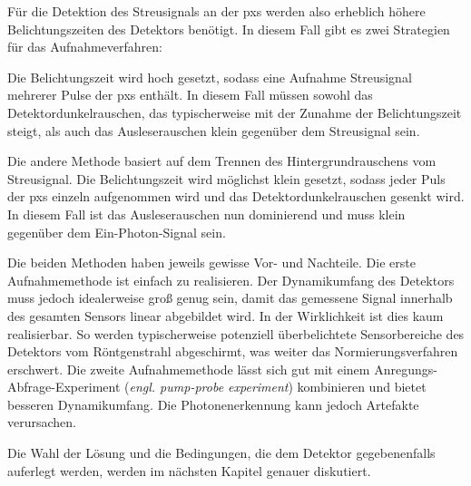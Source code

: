 \noindent
Für die Detektion des Streusignals an der \gls{pxs} werden also erheblich höhere Belichtungszeiten des Detektors benötigt. In diesem Fall gibt es zwei Strategien für das Aufnahmeverfahren:

\noindent
Die Belichtungszeit wird hoch gesetzt, sodass eine Aufnahme Streusignal mehrerer Pulse der \gls{pxs} enthält. In diesem Fall müssen sowohl das Detektordunkelrauschen, das typischerweise mit der Zunahme der Belichtungszeit steigt, als auch das Ausleserauschen klein gegenüber dem Streusignal sein.

\noindent
Die andere Methode basiert auf dem Trennen des Hintergrundrauschens vom Streusignal. Die Belichtungszeit wird möglichst klein gesetzt, sodass jeder Puls der \gls{pxs} einzeln aufgenommen wird und das Detektordunkelrauschen gesenkt wird. In diesem Fall ist das Ausleserauschen nun dominierend und muss klein gegenüber dem Ein-Photon-Signal sein.

\noindent
Die beiden Methoden haben jeweils gewisse Vor- und Nachteile. Die erste Aufnahmemethode ist einfach zu realisieren. Der Dynamikumfang des Detektors muss jedoch idealerweise groß genug sein, damit das gemessene Signal innerhalb des gesamten Sensors linear abgebildet wird. In der Wirklichkeit ist dies kaum realisierbar. So werden typischerweise potenziell überbelichtete Sensorbereiche des Detektors vom Röntgenstrahl abgeschirmt, was weiter das Normierungsverfahren erschwert. Die zweite Aufnahmemethode lässt sich gut mit einem Anregungs-Abfrage-Experiment (\emph{engl. pump-probe experiment}) kombinieren und bietet besseren Dynamikumfang. Die Photonenerkennung kann jedoch Artefakte verursachen.

\noindent
Die Wahl der Lösung und die Bedingungen, die dem Detektor gegebenenfalls auferlegt werden, werden im nächsten Kapitel genauer diskutiert.


